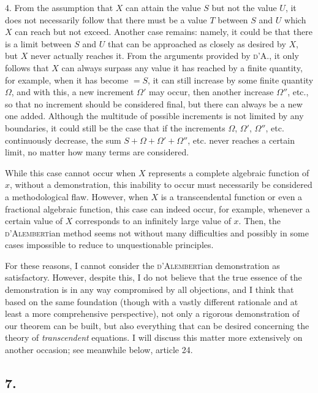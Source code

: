 \documentclass[12pt]{memoir}
\theoremstyle{plain}
\theoremstyle{remark}
\begin{document}
 4. From the assumption that \(X\) can attain the value \(S\) but not the value \(U\), it does not necessarily follow that there must be a value \(T\) between \(S\) and \(U\) which \(X\) can reach but not exceed. Another case remains: namely, it could be that there is a limit between \(S\) and \(U\) that can be approached as closely as desired by \(X\), but \(X\) never actually reaches it. From the arguments provided by \textsc{d'A.}, it only follows that \(X\) can always surpass any value it has reached by a finite quantity, for example, when it has become \(= S\), it can still increase by some finite quantity \(\Omega\), and with this, a new increment \(\Omega'\) may occur, then another increase \(\Omega''\), etc., so that no increment should be considered final, but there can always be a new one added. Although the multitude of possible increments is not limited by any boundaries, it could still be the case that if the increments \(\Omega\), \(\Omega'\), \(\Omega''\), etc. continuously decrease, the sum \(S + \Omega + \Omega' + \Omega''\), etc. never reaches a certain limit, no matter how many terms are considered.

While this case cannot occur when \(X\) represents a complete algebraic function of \(x\), without a demonstration, this inability to occur must necessarily be considered a methodological flaw. However, when \(X\) is a transcendental function or even a fractional algebraic function, this case can indeed occur, for example, whenever a certain value of \(X\) corresponds to an infinitely large value of \(x\). Then, the \textsc{d'Alembert}ian method seems not without many difficulties and possibly in some cases impossible to reduce to unquestionable principles.

For these reasons, I cannot consider the \textsc{d'Alembert}ian demonstration as satisfactory. However, despite this, I do not believe that the true essence of the demonstration is in any way compromised by all objections, and I think that based on the same foundation (though with a vastly different rationale and at least a more comprehensive perspective), not only a rigorous demonstration of our theorem can be built, but also everything that can be desired concerning the theory of \textit{transcendent} equations. I will discuss this matter more extensively on another occasion; see meanwhile below, article 24.

 \subsection*{7.}
\end{document}
